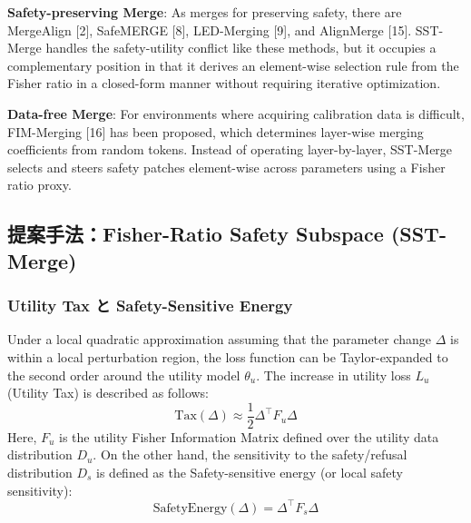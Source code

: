 \documentclass{article}
\begin{document}
\textbf{Safety-preserving Merge}: As merges for preserving safety, there are MergeAlign [2], SafeMERGE [8], LED-Merging [9], and AlignMerge [15]. SST-Merge handles the safety-utility conflict like these methods, but it occupies a complementary position in that it derives an element-wise selection rule from the Fisher ratio in a closed-form manner without requiring iterative optimization.

\textbf{Data-free Merge}: For environments where acquiring calibration data is difficult, FIM-Merging [16] has been proposed, which determines layer-wise merging coefficients from random tokens. Instead of operating layer-by-layer, SST-Merge selects and steers safety patches element-wise across parameters using a Fisher ratio proxy.

\subsection{提案手法：Fisher-Ratio Safety Subspace (SST-Merge)}

\subsubsection{Utility Tax と Safety-Sensitive Energy}

Under a local quadratic approximation assuming that the parameter change $\Delta$ is within a local perturbation region, the loss function can be Taylor-expanded to the second order around the utility model $\theta_u$. The increase in utility loss $L_u$ (Utility Tax) is described as follows:
\[ \text{Tax}(\Delta) \approx \frac{1}{2} \Delta^\top F_u \Delta \]
Here, $F_u$ is the utility Fisher Information Matrix defined over the utility data distribution $D_u$. On the other hand, the sensitivity to the safety/refusal distribution $D_s$ is defined as the Safety-sensitive energy (or local safety sensitivity):
\[ \text{SafetyEnergy}(\Delta) = \Delta^\top F_s \Delta \]
\end{document}
